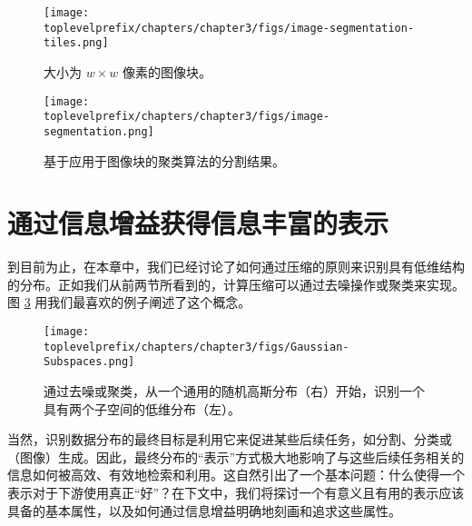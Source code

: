 \documentclass[../../book-main_zh.tex]{subfiles}
\begin{document}
\begin{figure}
	\centering
	\texttt{[image: \\toplevelprefix/chapters/chapter3/figs/image-segmentation-tiles.png]}
	\caption{大小为 $w\times w$ 像素的图像块。}
	\label{fig:image-patch}
\end{figure}

\begin{figure}[th]
	\centering
	\texttt{[image: \\toplevelprefix/chapters/chapter3/figs/image-segmentation.png]}
	\caption{基于应用于图像块的聚类算法的分割结果。}
	\label{fig:image-segmentation}
\end{figure}

\section{通过信息增益获得信息丰富的表示}
\label{sec:chap4-representation-learning-problem}




到目前为止，在本章中，我们已经讨论了如何通过压缩的原则来识别具有低维结构的分布。正如我们从前两节所看到的，计算压缩可以通过去噪操作或聚类来实现。图 \ref{fig:Gaussian-Subspaces} 用我们最喜欢的例子阐述了这个概念。
\begin{figure}[t]
    \centering
    \texttt{[image: \\toplevelprefix/chapters/chapter3/figs/Gaussian-Subspaces.png]}
    \caption{通过去噪或聚类，从一个通用的随机高斯分布（右）开始，识别一个具有两个子空间的低维分布（左）。}
    \label{fig:Gaussian-Subspaces}
\end{figure}
当然，识别数据分布的最终目标是利用它来促进某些后续任务，如分割、分类或（图像）生成。因此，最终分布的“表示”方式极大地影响了与这些后续任务相关的信息如何被高效、有效地检索和利用。这自然引出了一个基本问题：什么使得一个表示对于下游使用真正“好”？在下文中，我们将探讨一个有意义且有用的表示应该具备的基本属性，以及如何通过信息增益明确地刻画和追求这些属性。

\end{document}
